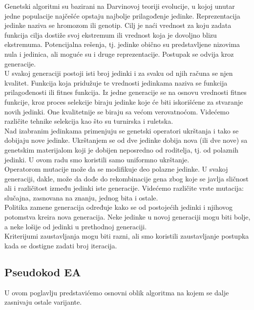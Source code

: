 \documentclass{article}
\begin{document}
Genetski algoritmi \cite{vi_Janicic} su bazirani na Darvinovoj teoriji evolucije, u kojoj unutar jedne populacije najčešće opstaju najbolje prilagođenje jedinke. Reprezentacija jedinke naziva se hromozom ili genotip. Cilj je naći vrednost za koju zadata funkcija cilja dostiže svoj ekstremum ili vrednost koja je dovoljno blizu ekstremuma. Potencijalna rešenja, tj. jedinke obično su predstavljene nizovima nula i jedinica, ali moguće su i druge reprezentacije. Postupak se odvija kroz generacije.\\

U svakoj generaciji postoji isti broj jedinki i za svaku od njih računa se njen kvalitet. Funkcija koja pridužuje te vrednosti jedinkama naziva se funkcija prilagođenosti ili fitnes funkcija. Iz jedne generacije se na osnovu vrednosti fitnes funkcije, kroz proces selekcije biraju jedinke koje će biti iskorišćene za stvaranje novih jedinki. One kvalitetnije se biraju sa većom verovatnoćom. Videćemo različite tehnike selekcija kao što su turnirska i ruletska. \\

Nad izabranim jedinkama primenjuju se genetski operatori ukrštanja i tako se dobijaju nove jedinke. Ukrštanjem se od dve jedinke dobija nova (ili dve nove) sa genetskim materijalom koji je dobijen neposredno od roditelja, tj. od polaznih jedinki. U ovom radu smo koristili samo uniformno ukrštanje. \\

Operatorom mutacije može da se modifikuje deo polazne jedinke. U svakoj generaciji, dakle, može da dođe do rekombinacije gena zbog koje se javlja sličnost ali i različitost između jedinki iste generacije. Videćemo različite vrste mutacija: slučajna, zasnovana na znanju, jednog bita i ostale. \\

Politika zamene generacija određuje kako se od postojećih jedinki i njihovog potomstva kreira nova generacija. Neke jedinke u novoj generaciji mogu biti bolje, a neke lošije od jedinki u prethodnoj generaciji. \\

Kriterijumi zaustavljanja mogu biti razni, ali smo koristili zaustavljanje postupka kada se dostigne zadati broj iteracija.

\subsection{Pseudokod EA}
\label{sec:ea_preudokod}

U ovom poglavlju predstavićemo osnovni oblik algoritma na kojem se dalje zasnivaju ostale varijante. 
\end{document}
